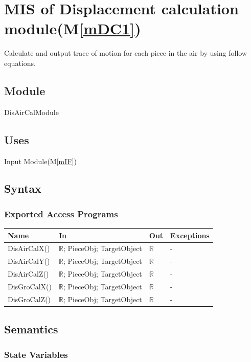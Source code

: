 \documentclass[12pt, titlepage]{article}
\newcommand{\mref}[1]{M\ref{#1}}
\begin{document}
\section{MIS of Displacement calculation module(\mref{mDC1})}

Calculate and output trace of motion for each piece in the air by using follow equations.
\subsection{Module}

DisAirCalModule

\subsection{Uses}

Input Module(\mref{mIF})
\subsection{Syntax}

\subsubsection{Exported Access Programs}

\begin{center}
	\begin{tabular}{p{3cm} p{6cm} p{4cm} p{2cm}}
		\hline
		\textbf{Name} & \textbf{In} & \textbf{Out} & \textbf{Exceptions} \\
		\hline
		DisAirCalX() & $\mathbb{R}$; PieceObj; TargetObject & $\mathbb{R}$ & - \\
		DisAirCalY() & $\mathbb{R}$; PieceObj; TargetObject & $\mathbb{R}$ & - \\
		DisAirCalZ() & $\mathbb{R}$; PieceObj; TargetObject & $\mathbb{R}$ & - \\
		DisGroCalX() & $\mathbb{R}$; PieceObj; TargetObject & $\mathbb{R}$ & - \\
		DisGroCalZ() & $\mathbb{R}$; PieceObj; TargetObject & $\mathbb{R}$ & - \\
		\hline
	\end{tabular}
\end{center}

\subsection{Semantics}

\subsubsection{State Variables}
\end{document}
